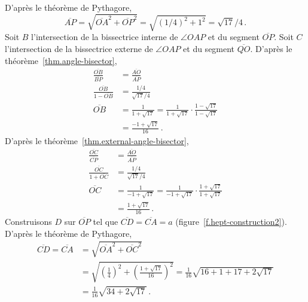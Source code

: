D'après le théorème de Pythagore,
\[
\overline{AP}=\sqrt{\overline{OA}^2+\overline{OP}^2}=\sqrt{(1/4)^2+1^2}=\sqrt{17}/4\,.
\]
Soit $B$ l'intersection de la bissectrice interne de $\angle OAP$ et du segment  $\overline{OP}$. Soit $C$ l'intersection de la bissectrice externe de $\angle OAP$ et du segment $\overline{QO}$. D'après le théorème~\ref{thm.angle-bisector},
\begin{align*}
\frac{\overline{OB}}{\overline{BP}}&=\frac{\overline{AO}}{\overline{AP}}\\
\frac{\overline{OB}}{1-\overline{OB}}&=\frac{1/4}{\sqrt{17}/{4}}\\
\overline{OB}&=\frac{1}{1+\sqrt{17}}=\frac{1}{1+\sqrt{17}}\cdot \frac{1-\sqrt{17}}{1-\sqrt{17}}\\
&=\frac{-1+\sqrt{17}}{16}\,.
\end{align*}
D'après le théorème~\ref{thm.external-angle-bisector},
\begin{align*}
\frac{\overline{OC}}{\overline{CP}}&=\frac{\overline{AO}}{\overline{AP}}\\
\frac{\overline{OC}}{1+\overline{OC}}&=\frac{1/4}{\sqrt{17}/{4}}\\
\overline{OC}&=\frac{1}{-1+\sqrt{17}}=\frac{1}{-1+\sqrt{17}}\cdot \frac{1+\sqrt{17}}{1+\sqrt{17}}\\
&=\frac{1+\sqrt{17}}{16}\,.
\end{align*}
Construisons $D$ sur $\overline{OP}$ tel que 
 $\overline{CD}=\overline{CA}=a$ (figure~\ref{f.hept-construction2}). D'après le théorème de Pythagore,
\begin{align*}
\overline{CD}=\overline{CA}&=\sqrt{\overline{OA}^2+\overline{OC}^2}\\
&=\sqrt{\left(\frac{1}{4}\right)^2+\left(\frac{1+\sqrt{17}}{16}\right)^2}=\frac{1}{16}\sqrt{16+1+17+2\sqrt{17}}\\
&=\frac{1}{16}\sqrt{34+2\sqrt{17}}\,.
\end{align*}


